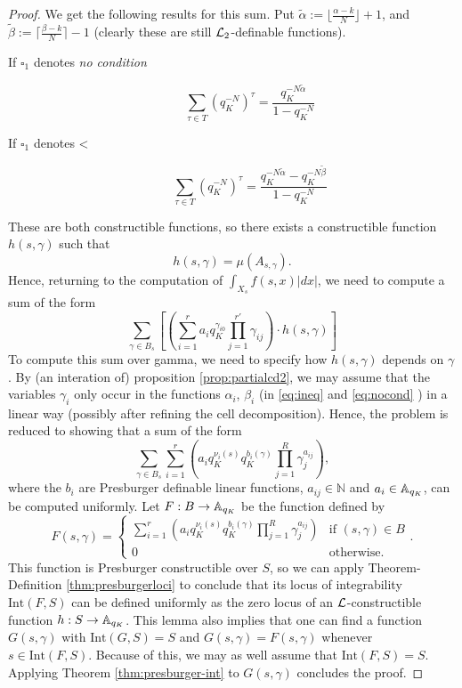\begin{proof}
We get the following results for this sum. 
Put $\tilde{\alpha}:= \lfloor\frac{\alpha -k}{N}\rfloor+1$, and $\tilde{\beta}:= \lceil\frac{\beta -k}{N}\rceil-1$ (clearly these are still $\Lm_2$-definable functions). 

\begin{description}
\item[If $\square_{1}$ denotes \emph{no condition}]
\begin{equation}\label{eq:nocond}\sum_{\tau \in T} (q_K^{-N})^\tau = \frac{q_K^{-N\tilde{\alpha}}}{1-q_K^{-N}} \end{equation}
\item[If $\square_{1}$ denotes <]
\begin{equation}\label{eq:ineq}\sum_{\tau \in T} (q_K^{-N})^\tau = \frac{q_K^{-N\tilde{\alpha}}-q_K^{-N\tilde{\beta}}}{1-q_K^{-N}} \end{equation}
\end{description}
These are both constructible functions, so there exists a constructible function $h(s,\gamma)$ such that \[h(s,\gamma) = \mu(A_{s, \gamma}).\]
Hence, returning to the computation of $\int_{X_s} f(s,x)|dx|$, we need to compute a sum of the form
\[\sum_{\gamma \in B_s}\left[ \left(\sum_{i=1}^r a_i q_K^{\gamma_{i0}} \prod_{j=1}^{r'}\gamma_{ij}\right) \cdot h(s,\gamma)\right]\]
To compute this sum over gamma, we need to specify how $h(s,\gamma)$ depends on $\gamma$. 
By (an interation of) proposition \ref{prop:partialcd2}, we may assume that the variables $\gamma_i$ only occur in the functions $\alpha_i$, $\beta_i$ (in \eqref{eq:ineq} and \eqref{eq:nocond} ) in a {\color{red} linear} way (possibly after refining the cell decomposition). Hence, the problem is reduced to showing that a sum of the form 
\[\sum_{\gamma \in B_s} \sum_{i=1}^r \left(a_i q_K^{\nu_i(s)}q_K^{b_i(\gamma)} \prod_{j=1}^{R}\gamma_{j}^{a_{ij}}\right),\]
where the $b_i$ are Presburger definable linear functions, %
$a_{ij} \in \mathbb{N}$ and $a_i \in \AA_{q_K}$, can be computed uniformly.
Let $F: B\to \AA_{q_K}$ be the function defined by
\[F(s,\gamma) = \left\{\begin{array}{ll}{\sum_{i=1}^r \left(a_i q_K^{\nu_i(s)}q_K^{b_i(\gamma)} \prod_{j=1}^{R}\gamma_{j}^{a_{ij}}\right)} & \text{if } (s,\gamma)\in B\\ 0 & \text{otherwise}.
\end{array}.\right.\]
This function is Presburger constructible over $S$, so we can apply
Theorem-Definition \ref{thm:presburgerloci} to conclude that its locus of integrability $\text{Int}(F,S)$ can be defined uniformly as the zero locus of an $\Lm$-constructible function $h: S\to \AA_{q_K}$. 
This lemma also implies that one can find a function $G(s,\gamma)$ with $\text{Int}(G,S)= S$ and $G(s,\gamma) = F(s,\gamma)$ whenever $s \in \text{Int}(F,S)$. Because of this, we may as well assume that $\text{Int}(F,S)=S$. Applying Theorem \ref{thm:presburger-int} to $G(s,\gamma)$ concludes the proof.
\end{proof}

